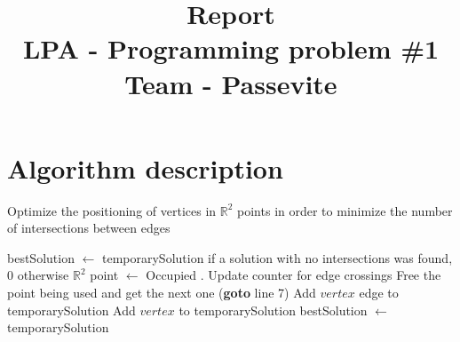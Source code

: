 \documentclass[12pt]{article}
\title{%
  Report \\
  \Large LPA - Programming problem \#1 \\
  \large Team - Passevite}
\date{\vspace{-5ex}}
\begin{document}
\maketitle

\section*{Algorithm description}\label{algorithmDesc}
\begin{algorithm} \small
    \caption*{\footnotesize Optimize the positioning of vertices in $\mathbb{R}^2$ points in order to minimize the number of intersections between edges}\label{alg:optimizeIntersections}
    \begin{algorithmic}[1] \small
         
             \Return {}
            \Else 
            \State bestSolution $\gets$ temporarySolution 
            \State {} if a solution with no intersections was found, 0 otherwise
            \EndIf
        \EndIf
                \State $\mathbb{R}^2$ point $\gets$ Occupied
                    .
                            \State Update counter for edge crossings
                             
                            \State Free the point being used and get the next one (\textbf{goto} line 7) 
                            \EndIf
                        \EndIf
                    \EndFor
                    \State Add $vertex$ edge to temporarySolution
                \EndFor
                \State Add $vertex$ to temporarySolution
                 
                    \EndIf
                \Else 
                    \State bestSolution $\gets$ temporarySolution 
                    \EndIf
                \EndIf
            \EndIf
        \EndFor
        \EndProcedure
    \end{algorithmic}
\end{algorithm}
\end{document}
